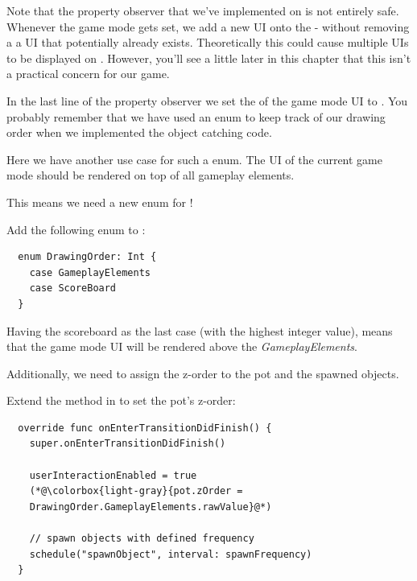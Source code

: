 \begin{details}
Note that the property observer that we've implemented on
 is not entirely safe. Whenever the game mode gets
set, we add a new UI onto the  - without removing a a UI
that potentially already exists. Theoretically this could cause multiple UIs to
be displayed on . However, you'll see a little later in
this chapter that this isn't a practical concern for our game.
\end{details}

In the last line of the property observer we set the  of the
game mode UI to . You probably
remember that we have used an enum to keep track of our drawing order when we
implemented the object catching code.

Here we have another use case for such a  enum. The UI
of the current game mode should be rendered on top of all gameplay elements. 

This means we need a new  enum for
!

\begin{leftbar}
Add the following enum to :
\begin{lstlisting}
  enum DrawingOrder: Int {
    case GameplayElements
    case ScoreBoard
  }
\end{lstlisting}
\end{leftbar}
Having the scoreboard as the last case (with the highest integer value),
means that the game mode UI will be rendered above the
\textit{GameplayElements}.

Additionally, we need to assign the  z-order to
the pot and the spawned objects.

\begin{leftbar}
Extend the  method in  to set
the pot's z-order:
\begin{lstlisting}
  override func onEnterTransitionDidFinish() {
    super.onEnterTransitionDidFinish()
    
    userInteractionEnabled = true
    (*@\colorbox{light-gray}{pot.zOrder =
    DrawingOrder.GameplayElements.rawValue}@*)
    
    // spawn objects with defined frequency
    schedule("spawnObject", interval: spawnFrequency)
  }
\end{lstlisting}
\end{leftbar}

